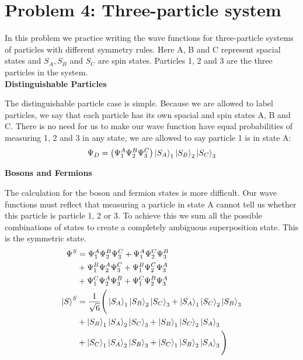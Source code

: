 \documentclass[10pt]{article} %
\begin{document}
\section{Problem 4: Three-particle system}
In this problem we practice writing the wave functions for three-particle systems of particles
with different symmetry rules. Here A, B and C represent spacial states and $S_A, S_B$ and $S_C$ are
spin states. Particles 1, 2 and 3 are the three particles in the system.\\

\textbf{Distinguishable Particles}

The distinguishable particle case is simple. Because we are allowed to label particles, we say that
each particle has its own spacial and spin states A, B and C. There is no need for us to make our
wave function have equal probabilities of measuring 1, 2 and 3 in any state, we are allowed to say
particle 1 is in state A:\\

\begin{align*}
  \Psi_D &= \left(\Psi_1^A\Psi_2^B\Psi_3^C\right)\ket{S_A}_1\ket{S_B}_2\ket{S_C}_3\\
\end{align*}

\textbf{Bosons and Fermions}

The calculation for the boson and fermion states is more difficult. Our wave functions must reflect
that measuring a particle in state A cannot tell us whether this particle is particle 1, 2 or 3. To
achieve this we sum all the possible combinations of states to create a completely ambiguous
superposition state. This is the symmetric state.\\

\begin{align*}
  \Psi^{S} &=
  \Psi_1^A\Psi_2^B\Psi_3^C + \Psi_1^A\Psi_2^C\Psi_3^B\\
  &+ \Psi_1^B\Psi_2^A\Psi_3^C + \Psi_1^B\Psi_2^C\Psi_3^A\\
  &+ \Psi_1^C\Psi_2^A\Psi_3^B + \Psi_1^C\Psi_2^B\Psi_3^A\\
  \ket{S}^{S} &=
  \frac{1}{\sqrt{6}}\Bigg(\ket{S_A}_1\ket{S_B}_2\ket{S_C}_3 + \ket{S_A}_1\ket{S_C}_2\ket{S_B}_3\\
  &+ \ket{S_B}_1\ket{S_A}_2\ket{S_C}_3 + \ket{S_B}_1\ket{S_C}_2\ket{S_A}_3\\
  &+ \ket{S_C}_1\ket{S_A}_2\ket{S_B}_3 + \ket{S_C}_1\ket{S_B}_2\ket{S_A}_3\Bigg)\\
\end{align*}
\end{document}
